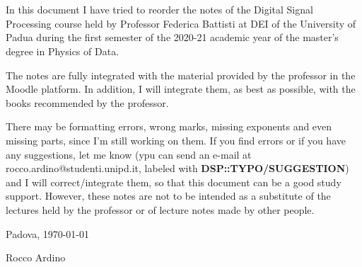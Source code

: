 \chapter*{}
\noindent In this document I have tried to reorder the notes of the Digital Signal Processing course held by Professor Federica Battisti at DEI of the University of Padua during the first semester of the 2020-21 academic year of the master's degree in Physics of Data.

The notes are fully integrated with the material provided by the professor in the Moodle platform. In addition, I will integrate them, as best as possible, with the books recommended by the professor.

There may be formatting errors, wrong marks, missing exponents and even missing parts, since I'm still working on them. If you find errors or if you have any suggestions, let me know (ypu can send an e-mail at rocco.ardino@studenti.unipd.it, labeled with \textbf{DSP::TYPO/SUGGESTION}) and I will correct/integrate them, so that this document can be a good study support. However, these notes are not to be intended as a substitute of the lectures held by the professor or of lecture notes made by other people.

\vspace{1cm}
\noindent \hfill Padova, \today%

\noindent \hfill Rocco Ardino%
